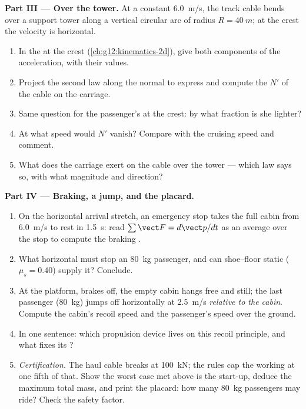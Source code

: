 \begin{problem}
\medskip
\noindent\textbf{Part III --- Over the tower.} At a constant \qty{6.0}{m/s}, the
track cable bends over a support tower along a vertical circular arc of radius
$R = \qty{40}{m}$; at the crest the velocity is horizontal.
\begin{enumerate}[resume]
  \item In the  at the crest (\cref{ch:g12:kinematics-2d}), give both
        components of the acceleration, with their values.
  \item Project the second law along the normal to express and compute the  $N'$ of the cable on the carriage.
  \item Same question for the passenger's  at the crest: by what
        fraction is she lighter?
  \item At what speed would $N'$ vanish? Compare with the cruising speed and comment.
  \item What  does the carriage exert on the cable over the tower --- which law
        says so, with what magnitude and direction?
\end{enumerate}

\medskip
\noindent\textbf{Part IV --- Braking, a jump, and the placard.}
\begin{enumerate}[resume]
  \item On the horizontal arrival stretch, an emergency stop takes the full cabin
        from \qty{6.0}{m/s} to rest in \qty{1.5}{s}: read $\sum \vect F = d\vect p/dt$
        as an average over the stop to compute the braking .
  \item What horizontal  must stop an \qty{80}{kg} passenger, and can
        shoe--floor static  ($\mu_s = 0.40$) supply it? Conclude.
  \item At the platform, brakes off, the empty cabin hangs free and still; the last
        passenger (\qty{80}{kg}) jumps off horizontally at \qty{2.5}{m/s}
        \emph{relative to the cabin}. Compute the cabin's recoil speed and the
        passenger's speed over the ground.
  \item In one sentence: which propulsion device lives on this recoil principle,
        and what fixes its ?
  \item \emph{Certification.} The haul cable breaks at \qty{100}{kN}; the rules cap
        the working  at one fifth of that. Show the worst case met above is
        the start-up, deduce the maximum total mass, and print the placard: how many
        \qty{80}{kg} passengers may ride? Check the safety factor.
\end{enumerate}
\end{problem}
